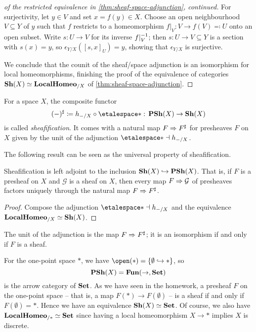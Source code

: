 \begin{proof}[of the restricted equivalence in \cref{thm:sheaf-space-adjunction}, continued]
For surjectivity, let \(y\in V\) and set \(x=f(y)\in X\).
Choose an open neighbourhood \(V\subseteq Y\) of \(y\) such that \(f\) restricts to a homeomorphism \(f|_V\colon V\to f(V) \eqcolon U\) onto an open subset.
Write \(s\colon U\to V\) for its inverse \(f|_V^{-1}\); then \(s\colon U\to V\subseteq Y\) is a section with \(s(x)=y\), so \(\epsilon_{Y/X}([s,x]_U)=y\), showing that \(\epsilon_{Y/X}\) is surjective.

We conclude that the counit of the sheaf/space adjunction is an isomorphism for local homeomorphisms, finishing the proof of the equivalence of categories \(\operatorname{\mathbf{Sh}}(X)\simeq\mathbf{LocalHomeo}_{/X}\) of \cref{thm:sheaf-space-adjunction}.
\end{proof}

\begin{defn}
For a space $X$, the composite functor
\[ (-)^\sharp \coloneq h_{-/X} \circ \etalespace* \colon \catPresheaf(X)\to\catSheaf(X) \]
is called \emph{sheafification}.
It comes with a natural map $F\Rightarrow F^\sharp$ for presheaves $F$ on $X$ given by the unit of the adjunction $\etalespace*\leftadj h_{-/X}$.
\end{defn}

The following result can be seen as the universal property of sheafification.

\begin{cor}\label{cor:sheafification-left-adjoint-to-inclusion}
Sheafification is left adjoint to the inclusion $\operatorname{\mathbf{Sh}}(X)\hookrightarrow\operatorname{\mathbf{PSh}}(X)$.
That is, if $F$ is a presheaf on $X$ and $\mathcal G$ is a sheaf on $X$, then every map $F\Rightarrow \mathcal G$ of presheaves factors uniquely through the natural map $F\Rightarrow F^\sharp$.
\end{cor}
\begin{proof}
Compose the adjunction $\etalespace*\leftadj h_{-/X}$ and the equivalence $\mathbf{LocalHomeo}_{/X}\simeq\operatorname{\mathbf{Sh}}(X)$.
\end{proof}

The unit of the adjunction is the map $F\Rightarrow F^\sharp$; it is an isomorphism if and only if $F$ is a sheaf.

\begin{exmp}
For the one-point space $*$, we have $\open(*) = \{\emptyset\hookrightarrow *\}$, so
\[ \operatorname{\mathbf{PSh}}(X) = \operatorname{\mathbf{Fun}}(\mathord{\to},\mathbf{Set}) \]
is the arrow category of $\mathbf{Set}$.
As we have seen in the homework, a presheaf $F$ on the one-point space -- that is, a map $F(*)\to F(\emptyset)$ -- is a sheaf if and only if $F(\emptyset)=*$.
Hence we have an equivalence $\operatorname{\mathbf{Sh}}(X)\simeq\mathbf{Set}$.
Of course, we also have $\mathbf{LocalHomeo}_{/*} \simeq\mathbf{Set}$ since having a local homeomorphism $X\to *$ implies $X$ is discrete.
\end{exmp}

